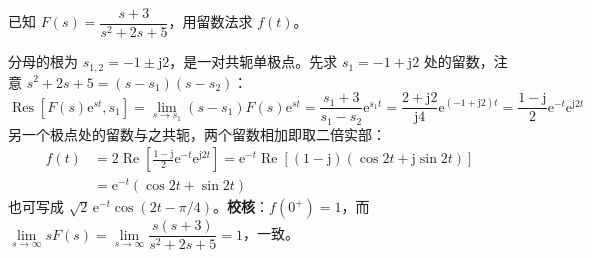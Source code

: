 \begin{longexample}[共轭复极点]
\label{exam:复极点}
已知 $F(s)=\dfrac{s+3}{s^{2}+2s+5}$，用留数法求 $f(t)$。
\begin{solution}
分母的根为 $s_{1,2}=-1\pm\mathrm{j}2$，是一对共轭单极点。先求 $s_1=-1+\mathrm{j}2$ 处的留数，注意 $s^{2}+2s+5=(s-s_1)(s-s_2)$：
\[
\operatorname{Res}\left[F(s)\mathrm{e}^{st},s_1\right]=\lim_{s\to s_1}(s-s_1)F(s)\mathrm{e}^{st}
=\frac{s_1+3}{s_1-s_2}\mathrm{e}^{s_1t}=\frac{2+\mathrm{j}2}{\mathrm{j}4}\mathrm{e}^{(-1+\mathrm{j}2)t}
=\frac{1-\mathrm{j}}{2}\mathrm{e}^{-t}\mathrm{e}^{\mathrm{j}2t}
\]
另一个极点处的留数与之共轭，两个留数相加即取二倍实部：
\[
\begin{aligned}
f(t)&=2\operatorname{Re}\left[\frac{1-\mathrm{j}}{2}\mathrm{e}^{-t}\mathrm{e}^{\mathrm{j}2t}\right]
=\mathrm{e}^{-t}\operatorname{Re}\left[(1-\mathrm{j})(\cos2t+\mathrm{j}\sin2t)\right]\\
&=\mathrm{e}^{-t}\left(\cos2t+\sin2t\right)
\end{aligned}
\]
也可写成 $\sqrt{2}\,\mathrm{e}^{-t}\cos(2t-\pi/4)$。\textbf{校核}：$f(0^{+})=1$，而 $\lim\limits_{s\to\infty}sF(s)=\lim\limits_{s\to\infty}\dfrac{s(s+3)}{s^{2}+2s+5}=1$，一致。
\end{solution}
\end{longexample}

